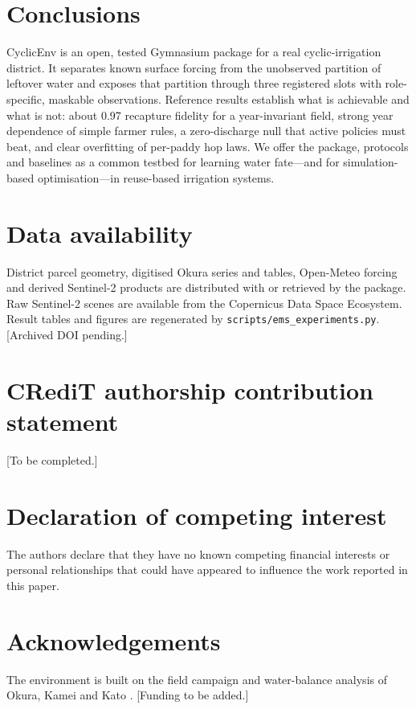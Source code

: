 \documentclass[preprint,12pt,authoryear,review]{elsarticle}
\begin{document}
\section{Conclusions}
\label{sec:conclusions}

CyclicEnv is an open, tested Gymnasium package for a real cyclic-irrigation district. It separates known surface forcing from the unobserved partition of leftover water and exposes that partition through three registered slots with role-specific, maskable observations. Reference results establish what is achievable and what is not: about 0.97 recapture fidelity for a year-invariant field, strong year dependence of simple farmer rules, a zero-discharge null that active policies must beat, and clear overfitting of per-paddy hop laws. We offer the package, protocols and baselines as a common testbed for learning water fate---and for simulation-based optimisation---in reuse-based irrigation systems.

\section*{Data availability}
District parcel geometry, digitised Okura series and tables, Open-Meteo forcing and derived Sentinel-2 products are distributed with or retrieved by the package. Raw Sentinel-2 scenes are available from the Copernicus Data Space Ecosystem. Result tables and figures are regenerated by \texttt{scripts/ems\_experiments.py}. [Archived DOI pending.]

\section*{CRediT authorship contribution statement}
[To be completed.]

\section*{Declaration of competing interest}
The authors declare that they have no known competing financial interests or personal relationships that could have appeared to influence the work reported in this paper.

\section*{Acknowledgements}
The environment is built on the field campaign and water-balance analysis of Okura, Kamei and Kato \citep{okura2025}. [Funding to be added.]
\end{document}
